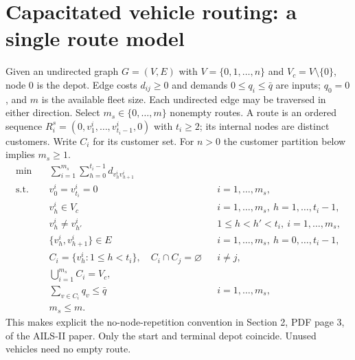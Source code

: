 \documentclass{article}
\begin{document}
\section*{Capacitated vehicle routing: a single route model}
Given an undirected graph $G=(V,E)$ with $V=\{0,1,\ldots,n\}$ and
$V_c=V\setminus\{0\}$, node $0$ is the depot. Edge costs $d_{ij}\ge0$
and demands $0\le q_i\le\bar q$ are inputs; $q_0=0$, and $m$ is the
available fleet size. Each undirected edge may be traversed in either direction.
Select $m_s\in\{0,\ldots,m\}$ nonempty routes. A route is an ordered
sequence $R_i^s=(0,v_1^i,\ldots,v_{t_i-1}^i,0)$ with $t_i\ge2$;
its internal nodes are distinct customers. Write $C_i$ for its customer set.
For $n>0$ the customer partition below implies $m_s\ge1$.
\begin{align*}
\min\quad &\sum_{i=1}^{m_s}\sum_{h=0}^{t_i-1}d_{v_h^i v_{h+1}^i}\\
\text{s.t.}\quad &v_0^i=v_{t_i}^i=0 && i=1,\ldots,m_s,\\
&v_h^i\in V_c &&i=1,\ldots,m_s,\ h=1,\ldots,t_i-1,\\
&v_h^i\ne v_{h'}^i &&1\le h<h'<t_i,\ i=1,\ldots,m_s,\\
&\{v_h^i,v_{h+1}^i\}\in E &&i=1,\ldots,m_s,\ h=0,\ldots,t_i-1,\\
&C_i=\{v_h^i:1\le h<t_i\},\quad C_i\cap C_j=\varnothing &&i\ne j,\\
&\bigcup_{i=1}^{m_s}C_i=V_c,\\
&\sum_{v\in C_i}q_v\le\bar q &&i=1,\ldots,m_s,\\
&m_s\le m.
\end{align*}
This makes explicit the no-node-repetition convention in Section 2, PDF page 3,
of the AILS-II paper. Only the start and terminal depot coincide. Unused vehicles
need no empty route.
\end{document}
